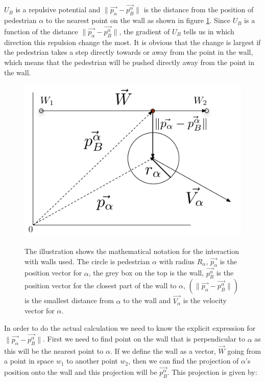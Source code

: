 $U_B$ is a repulsive potential and $\|\overrightarrow{p_{\alpha}} - \overrightarrow{p_{B}^{\alpha}}\|$ 
is the distance from the position of pedestrian $\alpha$ to the nearest point on the 
wall as shown in figure \ref{NotationOfWall}. Since $U_B$ is a function of the distance 
$\| \overrightarrow{p_{\alpha}} - \overrightarrow{p_{B}^{\alpha}} \|$, the gradient of $U_B$ tells us in 
which direction this repulsion change the most. It is obvious that the change is 
largest if the pedestrian takes a step directly towards or away from the point in the wall, 
which means that the pedestrian will be pushed directly away from the point in the wall.

\begin{figure}[ht]
\centering
{\includegraphics[scale=0.35]{Figures/NotationOfWall.pdf}} 
\caption[Notation of the interaction between an pedestrian and a wall]{The illustration shows the mathematical notation for the interaction with walls used. The circle is pedestrian $\alpha$ with radius $R_{\alpha}$, $\overrightarrow{p_{\alpha}}$ is the position vector for $\alpha$, the grey box on the top is the wall, $\overrightarrow{p_{B}^{\alpha}}$ is the position vector for the closest part of the wall to $\alpha$, $\left( \| \overrightarrow{p_{\alpha}} - \overrightarrow{p_{B}^{\alpha}} \| \right)$ is the smallest distance from $\alpha$ to the wall and $\overrightarrow{V_{\alpha}}$ is the velocity vector for $\alpha$.}
\label{NotationOfWall}
\end{figure}

In order to do the actual calculation we need to know the explicit expression for 
$ \| \overrightarrow{p_{\alpha}} - \overrightarrow{p_{B}^{\alpha}} \|$. First we need to find point on the wall 
that is perpendicular to $\alpha$ as this will be the nearest point to $\alpha$. If we define 
the wall as a vector, $\overrightarrow{W}$ going from a point in space $w_1$ to another point $w_2$, then 
we can find the projection of $\alpha$'s position onto the wall and this projection will be 
$\overrightarrow{p_{B}^{\alpha}}$. This projection is given by:

